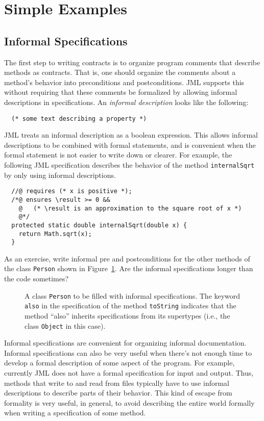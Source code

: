 \documentclass{jotarticle}
\begin{document}
\section{Simple Examples}
\subsection{Informal Specifications}

The first step to writing contracts is to organize program comments
that describe methods as contracts.
That is, one should organize the comments about a method's behavior
into preconditions and postconditions.
JML supports this without requiring that these comments be formalized
by allowing informal descriptions in specifications.
An \emph{informal description} looks like the following:

\begin{verbatim}
  (* some text describing a property *)
\end{verbatim}

JML treats an informal description as a boolean expression.
This allows informal descriptions to be combined with formal
statements, and is convenient when the formal statement is not easier
to write down or clearer.
For example, the following JML specification describes the behavior of
the method \texttt{internalSqrt} by only using informal descriptions.

\begin{verbatim}
  //@ requires (* x is positive *);
  /*@ ensures \result >= 0 &&
    @   (* \result is an approximation to the square root of x *)
    @*/
  protected static double internalSqrt(double x) {
    return Math.sqrt(x);
  }
\end{verbatim}

As an exercise, write informal pre and postconditions for the other
methods of the class \texttt{Person} shown in
Figure~\ref{fig-write-informal-spec}. Are the informal specifications
longer than the code sometimes?

\begin{figure}

\caption{A class \texttt{Person} to be filled with informal specifications.
  The keyword \texttt{also} in the specification of the method
  \texttt{toString} indicates that the method ``also'' inherits
  specifications from its supertypes (i.e., the class \texttt{Object}
  in this case).}
\label{fig-write-informal-spec}
\end{figure}

Informal specifications are convenient for organizing informal
documentation.  Informal specifications can also be very useful when
there's not enough time to develop a formal description of some aspect
of the program.  For example, currently JML does not have a formal
specification for input and output.  Thus, methods that write to and read
from files typically have to use informal descriptions to describe
parts of their behavior.  This kind of escape from formality is very
useful, in general, to avoid describing the entire world formally when
writing a specification of some method.
\end{document}
